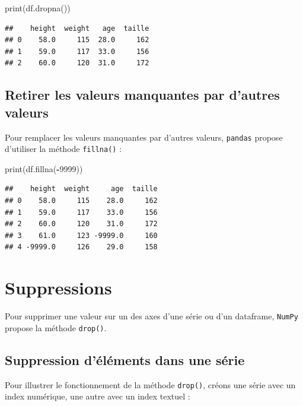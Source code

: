 \documentclass[12pt,]{book}
\newenvironment{Shaded}{\begin{snugshade}}{\end{snugshade}}
\newcommand{\DecValTok}[1]{\textcolor[rgb]{0.00,0.00,0.81}{#1}}
\newcommand{\OperatorTok}[1]{\textcolor[rgb]{0.81,0.36,0.00}{\textbf{#1}}}
\newcommand{\BuiltInTok}[1]{#1}
\newcommand{\NormalTok}[1]{#1}
\numberwithin{equation}{section}
\numberwithin{countremarque}{section}
\begin{document}
\begin{Shaded}
\begin{Highlighting}[]
\BuiltInTok{print}\NormalTok{(df.dropna())}
\end{Highlighting}
\end{Shaded}

\begin{lstlisting}
##    height  weight   age  taille
## 0    58.0     115  28.0     162
## 1    59.0     117  33.0     156
## 2    60.0     120  31.0     172
\end{lstlisting}

\subsection{Retirer les valeurs manquantes par d'autres
valeurs}\label{retirer-les-valeurs-manquantes-par-dautres-valeurs}

Pour remplacer les valeurs manquantes par d'autres valeurs,
\texttt{pandas} propose d'utiliser la méthode \texttt{fillna()} :

\begin{Shaded}
\begin{Highlighting}[]
\BuiltInTok{print}\NormalTok{(df.fillna(}\OperatorTok{-}\DecValTok{9999}\NormalTok{))}
\end{Highlighting}
\end{Shaded}

\begin{lstlisting}
##    height  weight     age  taille
## 0    58.0     115    28.0     162
## 1    59.0     117    33.0     156
## 2    60.0     120    31.0     172
## 3    61.0     123 -9999.0     160
## 4 -9999.0     126    29.0     158
\end{lstlisting}

\section{Suppressions}\label{suppressions}

Pour supprimer une valeur sur un des axes d'une série ou d'un dataframe,
\texttt{NumPy} propose la méthode \texttt{drop()}.

\subsection{Suppression d'éléments dans une
série}\label{suppression-delements-dans-une-serie}

Pour illustrer le fonctionnement de la méthode \texttt{drop()}, créons
une série avec un index numérique, une autre avec un index textuel :
\end{document}
